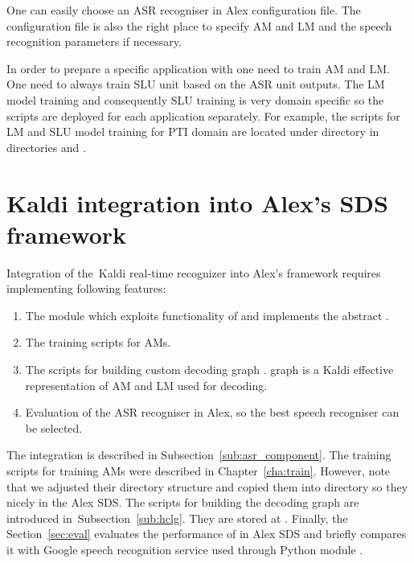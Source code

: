 One can easily choose an \ac{ASR} recogniser in Alex configuration file.
The configuration file is also the right place to specify \ac{AM} and \ac{LM} and the speech recognition parameters if necessary.

In order to prepare a specific application with  one need to train \ac{AM} and \ac{LM}.
One need to always train \ac{SLU} unit based on the \ac{ASR} unit outputs.
The \ac{LM} model training and consequently \ac{SLU} training is very domain specific so the scripts are deployed for each application separately.
For example, the scripts for \ac{LM} and \ac{SLU} model training for \ac{PTI} domain are located under directory  in directories  and .

\section[Kaldi integration into \acs{SDS} framework]{Kaldi integration into Alex's \acl{SDS} framework}
\label{sec:asrsds}

Integration of the~Kaldi real-time recognizer into Alex's framework requires implementing following features:
\begin{enumerate}
    \item The  module which exploits functionality of  and implements the abstract .
    \item The training scripts for \acp{AM}.
        \item The scripts for building custom decoding graph . graph is a Kaldi effective representation of \ac{AM} and \ac{LM} used for decoding. 
    \item Evaluation of the \ac{ASR} recogniser in Alex, so the best speech recogniser can be selected.
\end{enumerate}

The  integration is described in Subsection~\ref{sub:asr_component}.
The training scripts for training \acp{AM} were described in Chapter~\ref{cha:train}.
However, note that we adjusted their directory structure and copied them into  directory so they nicely in the Alex \ac{SDS}.
The scripts for building the  decoding graph are introduced in~Subsection~\ref{sub:hclg}.
They are stored at .
Finally, the Section~\ref{sec:eval} evaluates the performance of  in Alex \ac{SDS} and briefly compares it with Google speech recognition service used through Python module .


